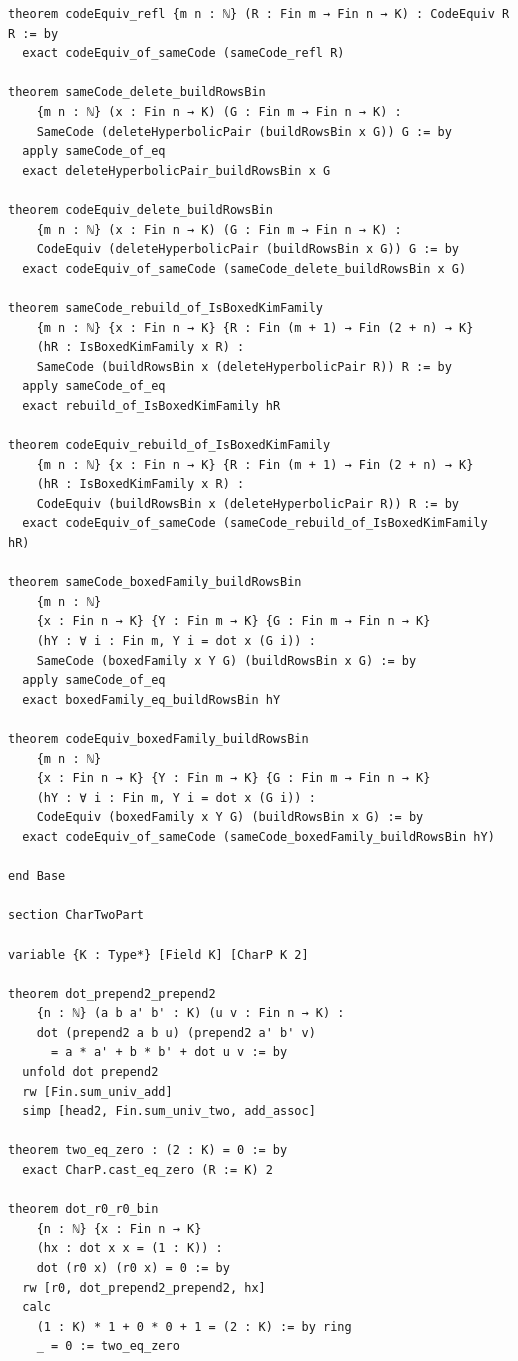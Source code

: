 \documentclass[12pt]{article}
\begin{document}
\begin{lstlisting}[caption={Lean verification for Theorem~\ref{thm:CZ_Kim_Lagrangian}.}]
theorem codeEquiv_refl {m n : ℕ} (R : Fin m → Fin n → K) : CodeEquiv R R := by
  exact codeEquiv_of_sameCode (sameCode_refl R)

theorem sameCode_delete_buildRowsBin
    {m n : ℕ} (x : Fin n → K) (G : Fin m → Fin n → K) :
    SameCode (deleteHyperbolicPair (buildRowsBin x G)) G := by
  apply sameCode_of_eq
  exact deleteHyperbolicPair_buildRowsBin x G

theorem codeEquiv_delete_buildRowsBin
    {m n : ℕ} (x : Fin n → K) (G : Fin m → Fin n → K) :
    CodeEquiv (deleteHyperbolicPair (buildRowsBin x G)) G := by
  exact codeEquiv_of_sameCode (sameCode_delete_buildRowsBin x G)

theorem sameCode_rebuild_of_IsBoxedKimFamily
    {m n : ℕ} {x : Fin n → K} {R : Fin (m + 1) → Fin (2 + n) → K}
    (hR : IsBoxedKimFamily x R) :
    SameCode (buildRowsBin x (deleteHyperbolicPair R)) R := by
  apply sameCode_of_eq
  exact rebuild_of_IsBoxedKimFamily hR

theorem codeEquiv_rebuild_of_IsBoxedKimFamily
    {m n : ℕ} {x : Fin n → K} {R : Fin (m + 1) → Fin (2 + n) → K}
    (hR : IsBoxedKimFamily x R) :
    CodeEquiv (buildRowsBin x (deleteHyperbolicPair R)) R := by
  exact codeEquiv_of_sameCode (sameCode_rebuild_of_IsBoxedKimFamily hR)

theorem sameCode_boxedFamily_buildRowsBin
    {m n : ℕ}
    {x : Fin n → K} {Y : Fin m → K} {G : Fin m → Fin n → K}
    (hY : ∀ i : Fin m, Y i = dot x (G i)) :
    SameCode (boxedFamily x Y G) (buildRowsBin x G) := by
  apply sameCode_of_eq
  exact boxedFamily_eq_buildRowsBin hY

theorem codeEquiv_boxedFamily_buildRowsBin
    {m n : ℕ}
    {x : Fin n → K} {Y : Fin m → K} {G : Fin m → Fin n → K}
    (hY : ∀ i : Fin m, Y i = dot x (G i)) :
    CodeEquiv (boxedFamily x Y G) (buildRowsBin x G) := by
  exact codeEquiv_of_sameCode (sameCode_boxedFamily_buildRowsBin hY)

end Base

section CharTwoPart

variable {K : Type*} [Field K] [CharP K 2]

theorem dot_prepend2_prepend2
    {n : ℕ} (a b a' b' : K) (u v : Fin n → K) :
    dot (prepend2 a b u) (prepend2 a' b' v)
      = a * a' + b * b' + dot u v := by
  unfold dot prepend2
  rw [Fin.sum_univ_add]
  simp [head2, Fin.sum_univ_two, add_assoc]

theorem two_eq_zero : (2 : K) = 0 := by
  exact CharP.cast_eq_zero (R := K) 2

theorem dot_r0_r0_bin
    {n : ℕ} {x : Fin n → K}
    (hx : dot x x = (1 : K)) :
    dot (r0 x) (r0 x) = 0 := by
  rw [r0, dot_prepend2_prepend2, hx]
  calc
    (1 : K) * 1 + 0 * 0 + 1 = (2 : K) := by ring
    _ = 0 := two_eq_zero


\end{lstlisting}
\end{document}
